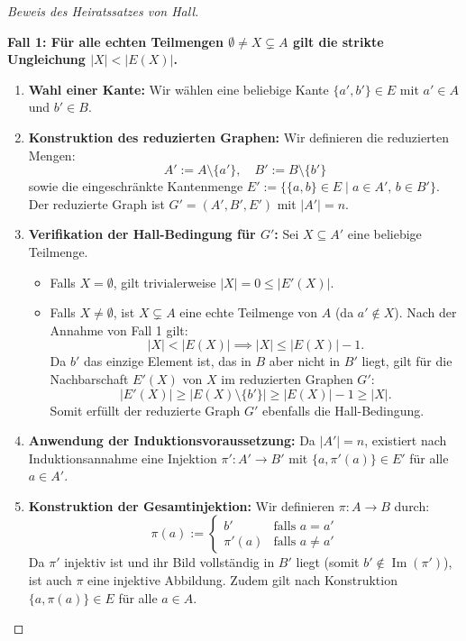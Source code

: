 \begin{proof}[Beweis des Heiratssatzes von Hall]
\begin{math-stroke}
\textbf{Fall 1: Für alle echten Teilmengen $\emptyset \neq X \subsetneq A$ gilt die strikte Ungleichung $|X| < |E(X)|$.}
\begin{enumerate}[label=\textbf{(\arabic*)}]
    \item \textbf{Wahl einer Kante:} Wir wählen eine beliebige Kante $\{a', b'\} \in E$ mit $a' \in A$ und $b' \in B$.
    \item \textbf{Konstruktion des reduzierten Graphen:} Wir definieren die reduzierten Mengen:
    \[
    A' := A \setminus \{a'\}, \quad B' := B \setminus \{b'\}
    \]
    sowie die eingeschränkte Kantenmenge $E' := \bigl\{ \{a, b\} \in E \;\big|\; a \in A', \, b \in B' \bigr\}$. Der reduzierte Graph ist $G' = (A', B', E')$ mit $|A'| = n$.
    \item \textbf{Verifikation der Hall-Bedingung für $G'$:} Sei $X \subseteq A'$ eine beliebige Teilmenge.
    \begin{itemize}
        \item Falls $X = \emptyset$, gilt trivialerweise $|X| = 0 \le |E'(X)|$.
        \item Falls $X \neq \emptyset$, ist $X \subsetneq A$ eine echte Teilmenge von $A$ (da $a' \notin X$). Nach der Annahme von Fall 1 gilt:
        \[
        |X| < |E(X)| \implies |X| \le |E(X)| - 1.
        \]
        Da $b'$ das einzige Element ist, das in $B$ aber nicht in $B'$ liegt, gilt für die Nachbarschaft $E'(X)$ von $X$ im reduzierten Graphen $G'$:
        \[
        |E'(X)| \ge |E(X) \setminus \{b'\}| \ge |E(X)| - 1 \ge |X|.
        \]
        Somit erfüllt der reduzierte Graph $G'$ ebenfalls die Hall-Bedingung.
    \end{itemize}
    \item \textbf{Anwendung der Induktionsvoraussetzung:} Da $|A'| = n$, existiert nach Induktionsannahme eine Injektion $\pi' \colon A' \to B'$ mit $\{a, \pi'(a)\} \in E'$ für alle $a \in A'$.
    \item \textbf{Konstruktion der Gesamtinjektion:} Wir definieren $\pi \colon A \to B$ durch:
    \[
    \pi(a) := \begin{cases}
    b' & \text{falls } a = a' \\
    \pi'(a) & \text{falls } a \neq a'
    \end{cases}
    \]
    Da $\pi'$ injektiv ist und ihr Bild vollständig in $B'$ liegt (somit $b' \notin \operatorname{Im}(\pi')$), ist auch $\pi$ eine injektive Abbildung. Zudem gilt nach Konstruktion $\{a, \pi(a)\} \in E$ für alle $a \in A$.
\end{enumerate}
        

\end{math-stroke}
\end{proof}
